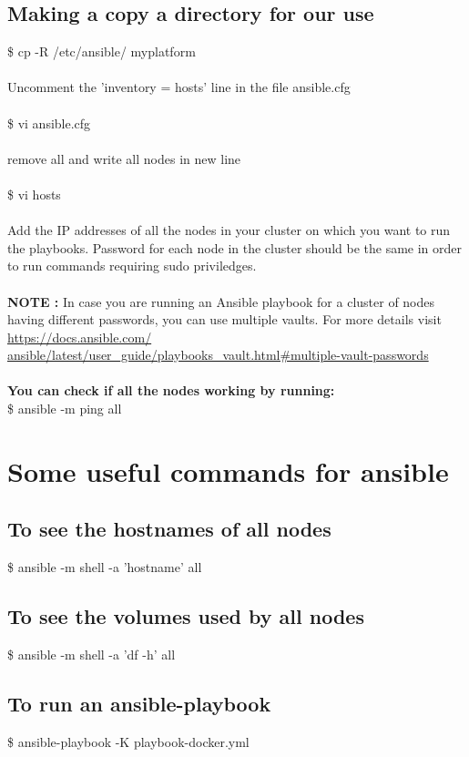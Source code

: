 \documentclass[12pt]{report}
\begin{document}
\subsection{Making a copy a directory for our use}
\$ cp -R /etc/ansible/ myplatform\\\\
Uncomment the 'inventory = hosts' line in the file ansible.cfg\\\\
\$ vi ansible.cfg \\\\
remove all and write all nodes in new line\\\\
\$ vi hosts \\\\
Add the IP addresses of all the nodes in your cluster on which you want to run the playbooks. Password for each node in the cluster should be the same in order to run commands requiring sudo priviledges.\\\\
\textbf{NOTE :} In case you are running an Ansible playbook for a cluster of nodes having different passwords, you can use multiple vaults. For more details visit \href{https://docs.ansible.com/ansible/latest/user_guide/playbooks_vault.html#multiple-vault-passwords}{https://docs.ansible.com/\\ansible/latest/user\_guide/playbooks\_vault.html\#multiple-vault-passwords}\cite{Ansiblevaults}\\\\ 
\textbf{You can check if all the nodes working by running:}\\
\$ ansible -m ping all
\section{Some useful commands for ansible}
\subsection{To see the hostnames of all nodes}
\$ ansible -m shell -a 'hostname' all
\subsection{To see the volumes used by all nodes}
\$ ansible -m shell -a 'df -h' all
\subsection{To run an ansible-playbook}
\$ ansible-playbook  -K playbook-docker.yml
\end{document}

